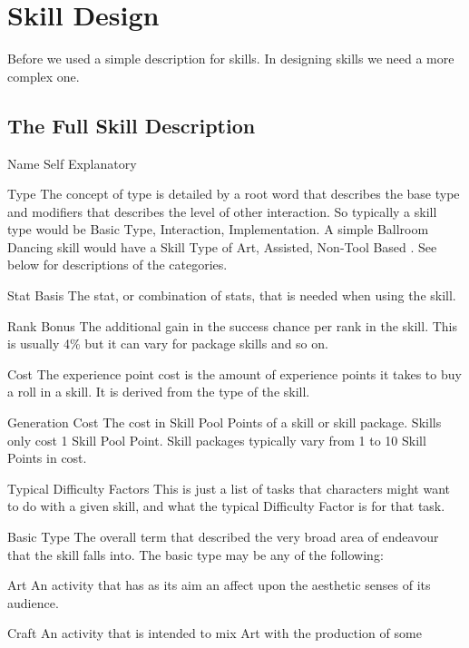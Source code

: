 \chapter{Skill Design}

Before we used a simple description for skills. In designing skills we need
a more complex one.

\section{The Full Skill Description}
\small

\begin{relate}
	\item[Name] Self Explanatory
	\item[Type] The concept of type is detailed by a root word that describes the base
	type and modifiers that describes the level of other interaction. So
	typically a skill type would be Basic Type, Interaction, Implementation.
	A simple Ballroom Dancing skill would have a Skill Type of
	Art, Assisted, Non-Tool Based . See below for descriptions of the
	categories.
	\item[Stat Basis] The stat, or combination of stats, that is needed
	when using the skill.
	\item[Rank Bonus] The additional gain in the success chance per rank
	in the skill. This is usually 4\% but it can vary for package skills
	and so on.
	\item[Cost]	The experience point cost is the amount of experience points it takes to
	buy a roll in a skill. It is derived from the type of the skill.
	\item[Generation Cost]
	The cost in Skill Pool Points of a skill or skill package. Skills
	only cost 1 Skill Pool Point. Skill packages typically vary from 1
	to 10 Skill Points in cost.
	\item[Typical Difficulty Factors]
	This is just a list of tasks that characters might want to do with a
	given skill, and what the typical Difficulty Factor is for that task.
	\item[Basic Type]
	The overall term that described the very broad area of
	endeavour that the skill falls into. The basic type may be any of the 
	following:
	\begin{relate}
		\item[Art]
		An activity that has as its aim an affect upon the aesthetic senses of its
		audience.
		\item[Craft]
		An activity that is intended to mix Art with the production of some

\end{relate}
\end{relate}
